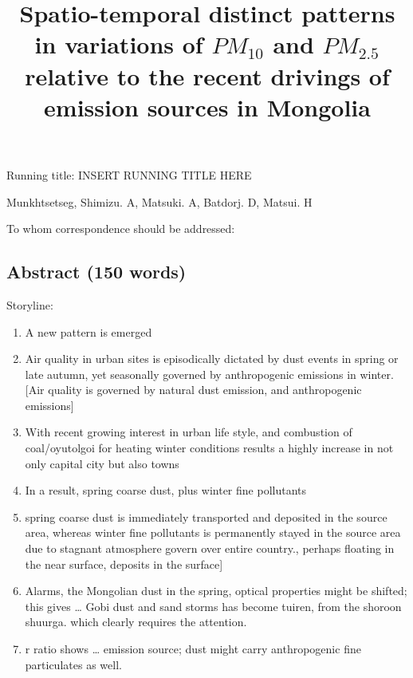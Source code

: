 \documentclass[
  11pt,
]{article}
\title{\textbf{Spatio-temporal distinct patterns in variations of
\(PM_{10}\) and \(PM_{2.5}\) relative to the recent drivings of emission
sources in Mongolia}}
\author{}
\date{\vspace{-2.5em}}
\providecommand{\tightlist}{%
  \setlength{\itemsep}{0pt}\setlength{\parskip}{0pt}}
\begin{document}
\maketitle

\vspace{35mm}

Running title: INSERT RUNNING TITLE HERE

\vspace{35mm}

Munkhtsetseg, Shimizu. A, Matsuki. A, Batdorj. D, Matsui. H

\vspace{40mm}

To whom correspondence should be addressed:

\newpage
\linenumbers

\subsection{Abstract (150 words)}\label{abstract-150-words}

Storyline:

\begin{enumerate}
\def\labelenumi{\arabic{enumi}.}
\tightlist
\item
  A new pattern is emerged
\item
  Air quality in urban sites is episodically dictated by dust events in
  spring or late autumn, yet seasonally governed by anthropogenic
  emissions in winter. {[}Air quality is governed by natural dust
  emission, and anthropogenic emissions{]}
\item
  With recent growing interest in urban life style, and combustion of
  coal/oyutolgoi for heating winter conditions results a highly increase
  in not only capital city but also towns
\item
  In a result, spring coarse dust, plus winter fine pollutants
\item
  spring coarse dust is immediately transported and deposited in the
  source area, whereas winter fine pollutants is permanently stayed in
  the source area due to stagnant atmosphere govern over entire
  country., perhaps floating in the near surface, deposits in the
  surface{]}
\item
  Alarms, the Mongolian dust in the spring, optical properties might be
  shifted; this gives \ldots{} Gobi dust and sand storms has become
  tuiren, from the shoroon shuurga. which clearly requires the
  attention.
\item
  r ratio shows \ldots{} emission source; dust might carry anthropogenic
  fine particulates as well.
\end{enumerate}
\end{document}
